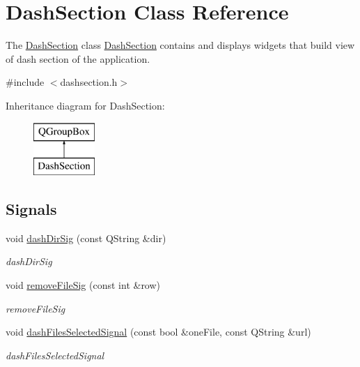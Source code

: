 \hypertarget{class_dash_section}{\section{Dash\-Section Class Reference}
\label{class_dash_section}
}


The \hyperlink{class_dash_section}{Dash\-Section} class \hyperlink{class_dash_section}{Dash\-Section} contains and displays widgets that build view of dash section of the application.  




{\ttfamily \#include $<$dashsection.\-h$>$}

Inheritance diagram for Dash\-Section\-:\begin{figure}[H]
\begin{center}
\leavevmode
\includegraphics[height=2.000000cm]{class_dash_section}
\end{center}
\end{figure}
\subsection*{Signals}
\begin{DoxyCompactItemize}
\item 
void \hyperlink{class_dash_section_a1def7fe671027a0aa457ef3928c5c584}{dash\-Dir\-Sig} (const Q\-String \&dir)
\begin{DoxyCompactList}\small\item\em dash\-Dir\-Sig \end{DoxyCompactList}\item 
void \hyperlink{class_dash_section_aa5d208d28ce0ca70904b5a709d714958}{remove\-File\-Sig} (const int \&row)
\begin{DoxyCompactList}\small\item\em remove\-File\-Sig \end{DoxyCompactList}\item 
void \hyperlink{class_dash_section_af294c83b94ff52df6a21aa6c01d681b2}{dash\-Files\-Selected\-Signal} (const bool \&one\-File, const Q\-String \&url)
\begin{DoxyCompactList}\small\item\em dash\-Files\-Selected\-Signal \end{DoxyCompactList}\end{DoxyCompactItemize}

